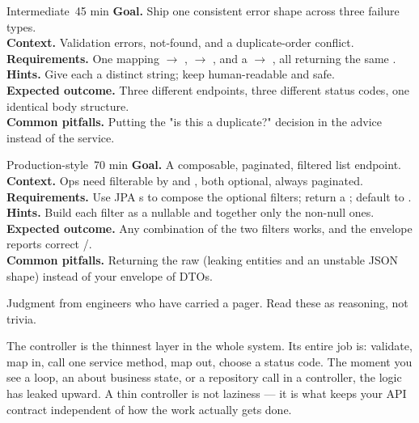 \begin{minilab}{Intermediate}{~45 min}
\textbf{Goal.} Ship one consistent error shape across three failure types.\\
\textbf{Context.} Validation errors, not-found, and a duplicate-order conflict.\\
\textbf{Requirements.} One  mapping  $\rightarrow$ ,  $\rightarrow$ , and a  $\rightarrow$ , all returning the same .\\
\textbf{Hints.} Give each a distinct  string; keep  human-readable and safe.\\
\textbf{Expected outcome.} Three different endpoints, three different status codes, one identical body structure.\\
\textbf{Common pitfalls.} Putting the "is this a duplicate?" decision in the advice instead of the service.
\end{minilab}

\begin{minilab}{Production-style}{~70 min}
\textbf{Goal.} A composable, paginated, filtered list endpoint.\\
\textbf{Context.} Ops need  filterable by  and , both optional, always paginated.\\
\textbf{Requirements.} Use JPA s to compose the optional filters; return a ; default to .\\
\textbf{Hints.} Build each filter as a nullable  and  together only the non-null ones.\\
\textbf{Expected outcome.} Any combination of the two filters works, and the envelope reports correct /.\\
\textbf{Common pitfalls.} Returning the raw  (leaking entities and an unstable JSON shape) instead of your envelope of DTOs.
\end{minilab}


Judgment from engineers who have carried a pager. Read these as reasoning, not trivia.

\begin{seniornote}
The controller is the thinnest layer in the whole system. Its entire job is: validate, map in, call one service method, map out, choose a status code. The moment you see a loop, an  about business state, or a repository call in a controller, the logic has leaked upward. A thin controller is not laziness --- it is what keeps your API contract independent of how the work actually gets done.
\end{seniornote}

